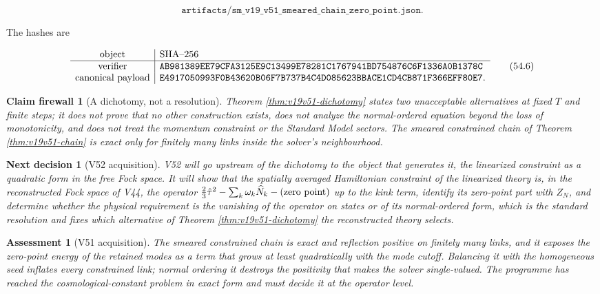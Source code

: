 \documentclass[11pt]{article}
\newtheorem{firewall}[theorem]{Claim firewall}
\newtheorem{decision}[theorem]{Next decision}
\newtheorem{assessment}[theorem]{Assessment}
\theoremstyle{remark}
\begin{document}
\[
 \texttt{artifacts/sm\_v19\_v51\_smeared\_chain\_zero\_point.json}.  \tag{54.5}
\]

The hashes are

\[
\begin{array}{c|l}
\hbox{object}&\hbox{SHA--256}\\ \hline
\hbox{verifier}&
\texttt{AB981389EE79CFA3125E9C13499E78281C1767941BD754876C6F1336A0B1378C}\\
\hbox{canonical payload}&
\texttt{E4917050993F0B43620B06F7B737B4C4D085623BBACE1CD4CB871F366EFF80E7}.
\end{array}                                                     \tag{54.6}
\]

\begin{firewall}[A dichotomy, not a resolution]
\label{fire:v19v51}
Theorem \ref{thm:v19v51-dichotomy} states two unacceptable
alternatives at fixed \(T\) and finite steps; it does not prove that
no other construction exists, does not analyze the normal-ordered
equation beyond the loss of monotonicity, and does not treat the
momentum constraint or the Standard Model sectors.  The smeared
constrained chain of Theorem \ref{thm:v19v51-chain} is exact only for
finitely many links inside the solver's neighbourhood.
\end{firewall}

\begin{decision}[V52 acquisition]
\label{dec:v19v51-next}
V52 will go upstream of the dichotomy to the object that generates it,
the linearized constraint as a quadratic form in the free Fock space.
It will show that the spatially averaged Hamiltonian constraint of the
linearized theory is, in the reconstructed Fock space of V44, the
operator \(\tfrac23\hat\tau^2-\sum_k\omega_k\widehat N_k-\hbox{(zero point)}\)
up to the kink term, identify its zero-point part with
\(Z_N\), and determine whether the physical requirement is the
vanishing of the operator on states or of its normal-ordered form,
which is the standard resolution and fixes which alternative of
Theorem \ref{thm:v19v51-dichotomy} the reconstructed theory selects.
\end{decision}

\begin{assessment}[V51 acquisition]
\label{ass:v19v51}
The smeared constrained chain is exact and reflection positive on
finitely many links, and it exposes the zero-point energy of the
retained modes as a term that grows at least quadratically with the
mode cutoff.  Balancing it with the homogeneous seed inflates every
constrained link; normal ordering it destroys the positivity that
makes the solver single-valued.  The programme has reached the
cosmological-constant problem in exact form and must decide it at the
operator level.
\end{assessment}
\end{document}

